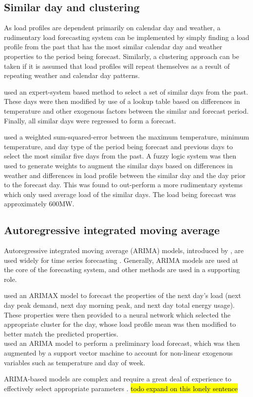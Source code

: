 \subsection{Similar day and clustering}
As load profiles are dependent primarily on calendar day and weather, a rudimentary load forecasting system can be implemented by simply finding a load profile from the past that has the most similar calendar day and weather properties to the period being forecast. 
Similarly, a clustering approach can be taken if it is assumed that load profiles will repeat themselves as a result of repeating weather and calendar day patterns.
\par
\citet{Rahman1993} used an expert-system based method to select a set of similar days from the past. 
These days were then modified by use of a lookup table based on differences in temperature and other exogenous factors between the similar and forecast period.
Finally, all similar days were regressed to form a forecast.
\par
\citet{Senjyu1998} used a weighted sum-squared-error between the maximum temperature, minimum temperature, and day type of the period being forecast and previous days to select the most similar five days from the past.
A fuzzy logic system was then used to generate weights to augment the similar days based on differences in weather and differences in load profile between the similar day and the day prior to the forecast day.
This was found to out-perform a more rudimentary systems which only used average load of the similar days.
The load being forecast was approximately 600MW.
\par
{}


\subsection{Autoregressive integrated moving average}
Autoregressive integrated moving average (ARIMA) models, introduced by \citet{Box1970}, are used widely for time series forecasting \citep{Weron2006}. 
Generally, ARIMA models are used at the core of the forecasting system, and other methods are used in a supporting role. 
\par
\citet{Bennett2014} used an ARIMAX model to forecast the properties of the next day's load (next day peak demand, next day morning peak, and next day total energy usage). These properties were then provided to a neural network which selected the appropriate cluster for the day, whose load profile mean was then modified to better match the predicted properties.
\\
\citet{Karthika2017} used an ARIMA model to perform a preliminary load forecast, which was then augmented by a support vector machine to account for non-linear exogenous variables such as temperature and day of week.
\par
ARIMA-based models are complex and require a great deal of experience to effectively select appropriate parameters \citep{Desouky2000}.
\hl{todo expand on this lonely sentence}

